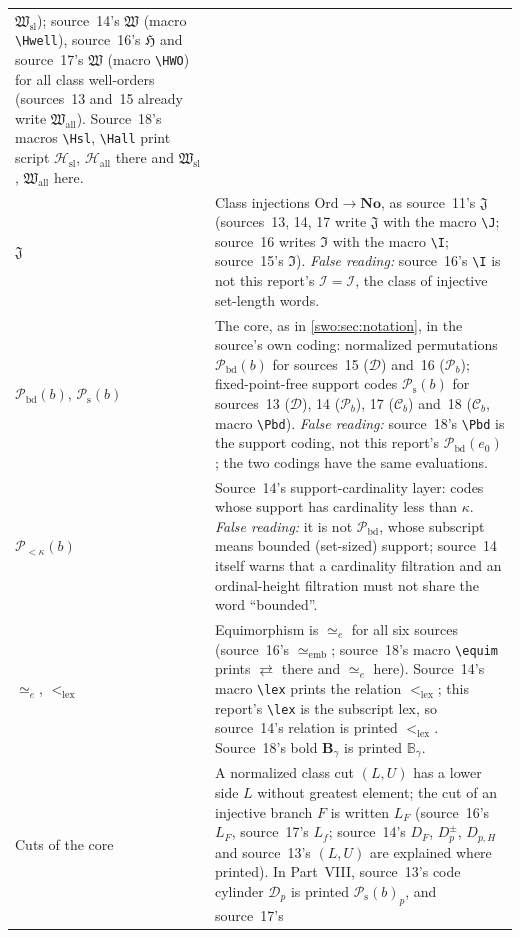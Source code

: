 \documentclass[11pt]{article}
\theoremstyle{definition}
\theoremstyle{remark}
\newcommand{\No}{\mathbf{No}}
\newcommand{\Ord}{\mathrm{Ord}}
\newcommand{\I}{\mathcal I}
\newcommand{\Hsl}{\mathfrak W_{\mathrm{sl}}}
\newcommand{\Hall}{\mathfrak W_{\mathrm{all}}}
\newcommand{\Jinj}{\mathfrak J}
\newcommand{\Pbd}{\mathcal P_{\mathrm{bd}}}
\newcommand{\Psupp}{\mathcal P_{\mathrm{s}}}
\newcommand{\B}{\mathbb B}
\newcommand{\lex}{\mathrm{lex}}
\newcommand{\equi}{\mathrel{\simeq_{\!e}}}
\newcommand{\equim}{\mathrel{\simeq_{\!e}}}
\begin{document}
\begin{longtable}{@{}>{\raggedright\arraybackslash}p{}>{\raggedright\arraybackslash}p{}@{}}
$\mathfrak W_{\mathrm{sl}}$); source~14's $\mathfrak W$ (macro \verb|\Hwell|),
source~16's $\mathfrak H$ and source~17's $\mathfrak W$ (macro \verb|\HWO|) for
all class well-orders (sources~13 and~15 already write
$\mathfrak W_{\mathrm{all}}$). Source~18's macros \verb|\Hsl|, \verb|\Hall|
print script $\mathscr H_{\mathrm{sl}}$, $\mathscr H_{\mathrm{all}}$ there and
$\mathfrak W_{\mathrm{sl}}$, $\mathfrak W_{\mathrm{all}}$ here.\\[3pt]
$\Jinj$ &
Class injections $\Ord\to\No$, as source~11's $\Jinj$ (sources~13, 14, 17 write
$\mathfrak J$ with the macro \verb|\J|; source~16 writes $\mathfrak I$ with
the macro \verb|\I|; source~15's $\mathfrak I$). \emph{False reading:}
source~16's \verb|\I| is not this report's $\I=\mathcal I$, the class of
injective set-length words.\\[3pt]
$\Pbd(b)$, $\Psupp(b)$ &
The core, as in \cref{swo:sec:notation}, in the source's own coding: normalized
permutations $\Pbd(b)$ for sources~15 ($\mathcal D$) and~16 ($\mathcal P_b$);
fixed-point-free support codes $\Psupp(b)$ for sources~13 ($\mathcal D$), 14
($\mathcal P_b$), 17 ($\mathcal C_b$) and~18 ($\mathcal C_b$, macro
\verb|\Pbd|). \emph{False reading:} source~18's \verb|\Pbd| is the support
coding, not this report's $\Pbd(e_0)$; the two codings have the same
evaluations.\\[3pt]
$\mathcal P_{<\kappa}(b)$ &
Source~14's support-cardinality layer: codes whose support has cardinality
less than $\kappa$. \emph{False reading:} it is not $\Pbd$, whose subscript
means bounded (set-sized) support; source~14 itself warns that a cardinality
filtration and an ordinal-height filtration must not share the word
``bounded''.\\[3pt]
$\equi$, $<_\lex$ &
Equimorphism is $\equi$ for all six sources (source~16's
$\simeq_{\mathrm{emb}}$; source~18's macro \verb|\equim| prints
$\rightleftarrows$ there and $\simeq_e$ here). Source~14's macro \verb|\lex|
prints the relation $<_{\mathrm{lex}}$; this report's \verb|\lex| is the
subscript $\mathrm{lex}$, so source~14's relation is printed $<_\lex$.
Source~18's bold $\mathbf B_\gamma$ is printed $\B_\gamma$.\\[3pt]
Cuts of the core &
A normalized class cut $(L,U)$ has a lower side $L$ without greatest element;
the cut of an injective branch $F$ is written $L_F$ (source~16's $L_F$,
source~17's $L_f$; source~14's $D_F$, $D^\pm_p$, $D_{p,H}$ and source~13's
$(L,U)$ are explained where printed). In Part~VIII, source~13's code
cylinder $\mathcal D_p$ is printed $\Psupp(b)_p$, and source~17's

\end{longtable}
\end{document}
